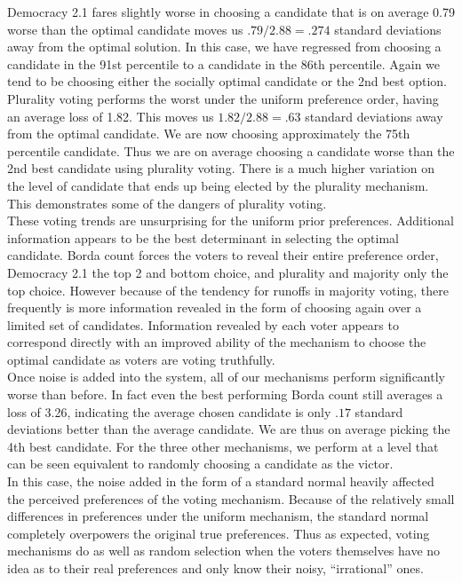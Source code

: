 \documentclass[11pt]{scrartcl}
\begin{document}
Democracy 2.1 fares slightly worse in choosing a candidate that is on average 0.79 worse than the optimal candidate moves us $.79/2.88 = .274$ standard deviations away from the optimal solution. In this case, we have regressed from choosing a candidate in the 91st percentile to a candidate in the 86th percentile. Again we tend to be choosing either the socially optimal candidate or the 2nd best option.\\

Plurality voting performs the worst under the uniform preference order, having an average loss of 1.82. This moves us $1.82/2.88 = .63$ standard deviations away from the optimal candidate. We are now choosing approximately the 75th percentile candidate. Thus we are on average choosing a candidate worse than the 2nd best candidate using plurality voting. There is a much higher variation on the level of candidate that ends up being elected by the plurality mechanism. This demonstrates some of the dangers of plurality voting.\\

These voting trends are unsurprising for the uniform prior preferences. Additional information appears to be the best determinant in selecting the optimal candidate. Borda count forces the voters to reveal their entire preference order, Democracy 2.1 the top 2 and bottom choice, and plurality and majority only the top choice. However because of the tendency for runoffs in majority voting, there frequently is more information revealed in the form of choosing again over a limited set of candidates. Information revealed by each voter appears to correspond directly with an improved ability of the mechanism to choose the optimal candidate as voters are voting truthfully.\\

Once noise is added into the system, all of our mechanisms perform significantly worse than before. In fact even the best performing Borda count still averages a loss of 3.26, indicating the average chosen candidate is only $.17$ standard deviations better than the average candidate. We are thus on average picking the 4th best candidate. For the three other mechanisms, we perform at a level that can be seen equivalent to randomly choosing a candidate as the victor.\\

In this case, the noise added in the form of a standard normal heavily affected the perceived preferences of the voting mechanism. Because of the relatively small differences in preferences under the uniform mechanism, the standard normal completely overpowers the original true preferences. Thus as expected, voting mechanisms do as well as random selection when the voters themselves have no idea as to their real preferences and only know their noisy, ``irrational'' ones.
\end{document}
